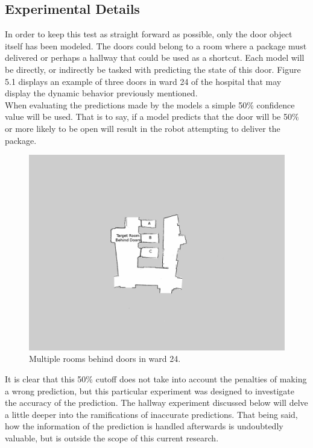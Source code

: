   \subsection{ Experimental Details }

  In order to keep this test as straight forward as possible, only the door
  object itself has been modeled. The doors could belong to a room where a
  package must delivered or perhaps a hallway that could be used as a
  shortcut. Each model will be directly, or indirectly be tasked with
  predicting the state of this door. Figure 5.1 displays an example of three
  doors in ward 24 of the hospital that may display the dynamic behavior
  previously mentioned. \\

  When evaluating the predictions made by the models a simple 50\% confidence
  value will be used. That is to say, if a model predicts that the door will
  be 50\% or more likely to be open will result in the robot attempting to
  deliver the package. \\

  \begin{figure}[!htb]
    \centering
    \includegraphics[width=\linewidth]{images/ward_24_door.png}
    \caption{Multiple rooms behind doors in ward 24.}
    \label{figure:ward_24_door}
  \end{figure}

  It is clear that this 50\% cutoff does not take into account the penalties
  of making a wrong prediction, but this particular experiment was designed to
  investigate the accuracy of the prediction. The hallway experiment discussed
  below will delve a little deeper into the ramifications of inaccurate
  predictions. That being said, how the information of the prediction is
  handled afterwards is undoubtedly valuable, but is outside the scope of this
  current research.

